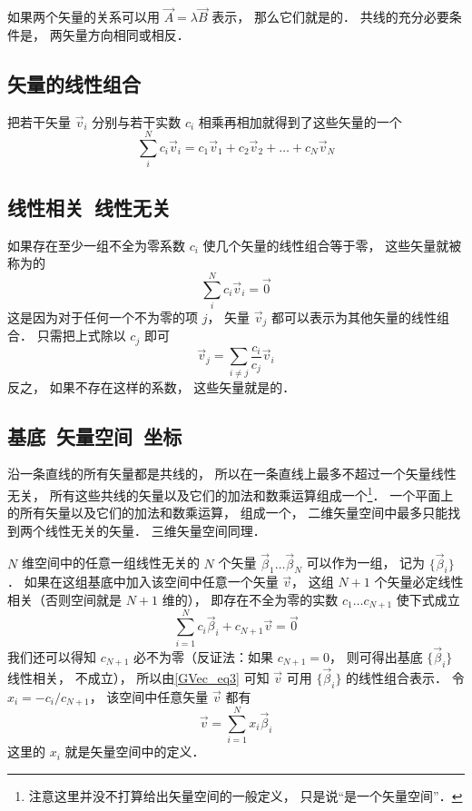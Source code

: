 如果两个矢量的关系可以用 $\vec A = \lambda\vec B$ 表示， 那么它们就是的． 共线的充分必要条件是， 两矢量方向相同或相反．

\subsection{矢量的线性组合}
把若干矢量 $\vec v_i$ 分别与若干实数 $c_i$ 相乘再相加就得到了这些矢量的一个
\begin{equation}
\sum_i^N c_i \vec v_i = c_1\vec v_1 + c_2\vec v_2 +\dots +c_N \vec v_N
\end{equation}

\subsection{线性相关\ 线性无关}
如果存在至少一组不全为零系数 $c_i$ 使几个矢量的线性组合等于零， 这些矢量就被称为的
\begin{equation}
\sum_i^N c_i \vec v_i = \vec 0
\end{equation}
这是因为对于任何一个不为零的项 $j$， 矢量 $\vec v_j$ 都可以表示为其他矢量的线性组合． 只需把上式除以 $c_j$ 即可
\begin{equation}\label{GVec_eq3}
\vec v_j = \sum_{i \ne j}\frac{c_i}{c_j} \vec v_i
\end{equation}
反之， 如果不存在这样的系数， 这些矢量就是的． 

\subsection{基底\ 矢量空间\ 坐标}
沿一条直线的所有矢量都是共线的， 所以在一条直线上最多不超过一个矢量线性无关， 所有这些共线的矢量以及它们的加法和数乘运算组成一个\footnote{注意这里并没不打算给出矢量空间的一般定义， 只是说“是一个矢量空间”．}． 一个平面上的所有矢量以及它们的加法和数乘运算， 组成一个， 二维矢量空间中最多只能找到两个线性无关的矢量． 三维矢量空间同理． 

$N$ 维空间中的任意一组线性无关的 $N$ 个矢量 $\vec \beta_1\dots \vec \beta_N$ 可以作为一组， 记为 $\{\vec \beta_i\}$． 如果在这组基底中加入该空间中任意一个矢量 $\vec v$， 这组 $N+1$ 个矢量必定线性相关（否则空间就是 $N+1$ 维的）， 即存在不全为零的实数 $c_1\dots c_{N+1}$ 使下式成立
\begin{equation}
\sum_{i=1}^N c_i \vec \beta_i + c_{N+1} \vec v = \vec 0
\end{equation}
我们还可以得知 $c_{N+1}$ 必不为零（反证法：如果 $c_{N+1} = 0$， 则可得出基底 $\{\vec \beta_i\}$ 线性相关， 不成立）， 所以由\autoref{GVec_eq3} 可知 $\vec v$ 可用 $\{\vec \beta_i\}$ 的线性组合表示． 令 $x_i = -c_i/c_{N+1}$， 该空间中任意矢量 $\vec v$ 都有
\begin{equation}\label{GVec_eq5}
\vec v = \sum_{i=1}^N x_i \vec \beta_i
\end{equation}
这里的 $x_i$ 就是矢量空间中的定义．


